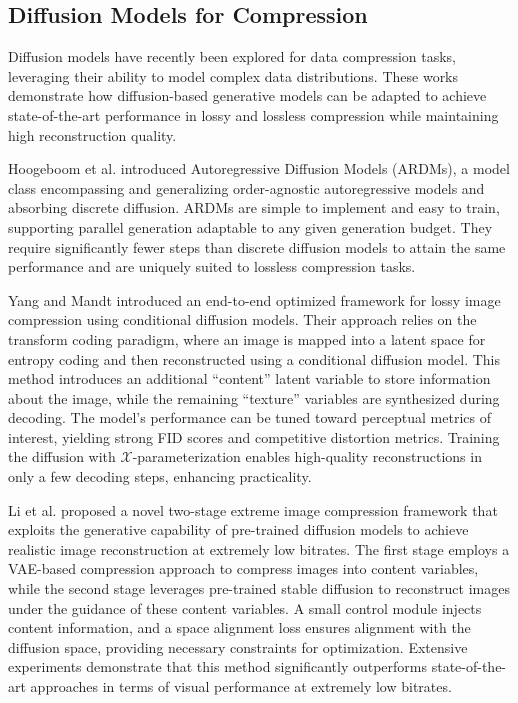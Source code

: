 \subsection{Diffusion Models for Compression}
Diffusion models have recently been explored for data compression tasks, leveraging their ability to model complex data distributions. These works demonstrate how diffusion-based generative models can be adapted to achieve state-of-the-art performance in lossy and lossless compression while maintaining high reconstruction quality.

Hoogeboom et al. \cite{Hoogeboom2022autoregressive} introduced Autoregressive Diffusion Models (ARDMs), a model class encompassing and generalizing order-agnostic autoregressive models and absorbing discrete diffusion. ARDMs are simple to implement and easy to train, supporting parallel generation adaptable to any given generation budget. They require significantly fewer steps than discrete diffusion models to attain the same performance and are uniquely suited to lossless compression tasks. 

Yang and Mandt \cite{Yang2023cd} introduced an end-to-end optimized framework for lossy image compression using conditional diffusion models. Their approach relies on the transform coding paradigm, where an image is mapped into a latent space for entropy coding and then reconstructed using a conditional diffusion model. This method introduces an additional ``content'' latent variable to store information about the image, while the remaining ``texture'' variables are synthesized during decoding. The model's performance can be tuned toward perceptual metrics of interest, yielding strong FID scores and competitive distortion metrics. Training the diffusion with $\mathcal{X}$-parameterization enables high-quality reconstructions in only a few decoding steps, enhancing practicality.

Li et al. \cite{Li2024extreme} proposed a novel two-stage extreme image compression framework that exploits the generative capability of pre-trained diffusion models to achieve realistic image reconstruction at extremely low bitrates. The first stage employs a VAE-based compression approach to compress images into content variables, while the second stage leverages pre-trained stable diffusion to reconstruct images under the guidance of these content variables. A small control module injects content information, and a space alignment loss ensures alignment with the diffusion space, providing necessary constraints for optimization. Extensive experiments demonstrate that this method significantly outperforms state-of-the-art approaches in terms of visual performance at extremely low bitrates.

